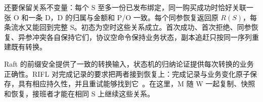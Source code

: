 还要保留关系不变量：每个 S 至多一份已发布绑定，同一购买成功时恰好关联一张 O 和一条 D，D 的归属与金额和 P/O 一致。每个同参恢复返回原 $R(S)$，每条流水又能回到完整 S。初态为空时这些关系成立。首次成功、首次拒绝、同参恢复、异参冲突各自保持它们，协议空命令保持业务状态，副本追赶只按同一序列重建既有转换。


Raft 的前缀安全提供了一致的转换输入，状态机的归纳论证提供每次转换的业务正确性。RIFL 对完成记录的要求把两者接到恢复上：完成记录与业务变化原子保存，具有相应持久性，并且重试能够找到它~\cite{rifl}。在这里，M 随 W 一起复制、快照和恢复，接班者才能在相同 S 上继续这些关系。
\FloatBarrier
